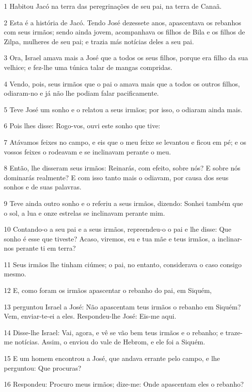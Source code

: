 \par 1 Habitou Jacó na terra das peregrinações de seu pai, na terra de Canaã.
\par 2 Esta é a história de Jacó. Tendo José dezessete anos, apascentava os rebanhos com seus irmãos; sendo ainda jovem, acompanhava os filhos de Bila e os filhos de Zilpa, mulheres de seu pai; e trazia más notícias deles a seu pai.
\par 3 Ora, Israel amava mais a José que a todos os seus filhos, porque era filho da sua velhice; e fez-lhe uma túnica talar de mangas compridas.
\par 4 Vendo, pois, seus irmãos que o pai o amava mais que a todos os outros filhos, odiaram-no e já não lhe podiam falar pacificamente.
\par 5 Teve José um sonho e o relatou a seus irmãos; por isso, o odiaram ainda mais.
\par 6 Pois lhes disse: Rogo-vos, ouvi este sonho que tive:
\par 7 Atávamos feixes no campo, e eis que o meu feixe se levantou e ficou em pé; e os vossos feixes o rodeavam e se inclinavam perante o meu.
\par 8 Então, lhe disseram seus irmãos: Reinarás, com efeito, sobre nós? E sobre nós dominarás realmente? E com isso tanto mais o odiavam, por causa dos seus sonhos e de suas palavras.
\par 9 Teve ainda outro sonho e o referiu a seus irmãos, dizendo: Sonhei também que o sol, a lua e onze estrelas se inclinavam perante mim.
\par 10 Contando-o a seu pai e a seus irmãos, repreendeu-o o pai e lhe disse: Que sonho é esse que tiveste? Acaso, viremos, eu e tua mãe e teus irmãos, a inclinar-nos perante ti em terra?
\par 11 Seus irmãos lhe tinham ciúmes; o pai, no entanto, considerava o caso consigo mesmo.
\par 12 E, como foram os irmãos apascentar o rebanho do pai, em Siquém,
\par 13 perguntou Israel a José: Não apascentam teus irmãos o rebanho em Siquém? Vem, enviar-te-ei a eles. Respondeu-lhe José: Eis-me aqui.
\par 14 Disse-lhe Israel: Vai, agora, e vê se vão bem teus irmãos e o rebanho; e traze-me notícias. Assim, o enviou do vale de Hebrom, e ele foi a Siquém.
\par 15 E um homem encontrou a José, que andava errante pelo campo, e lhe perguntou: Que procuras?
\par 16 Respondeu: Procuro meus irmãos; dize-me: Onde apascentam eles o rebanho?
